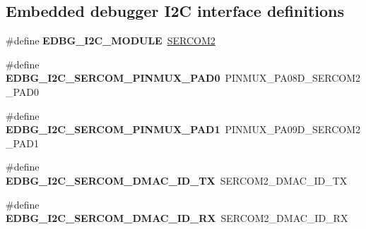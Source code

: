\subsection*{Embedded debugger I2\+C interface definitions}
\begin{DoxyCompactItemize}
\item 
\hypertarget{group__saml21__xplained__pro__features__group_ga86cb632d58e70b8725d9c8a744cc59d7}{}\#define {\bfseries E\+D\+B\+G\+\_\+\+I2\+C\+\_\+\+M\+O\+D\+U\+L\+E}~\hyperlink{group___s_a_m_l21_j18_a__base_ga918e4c85993961a115bb23b4bb73a87f}{S\+E\+R\+C\+O\+M2}\label{group__saml21__xplained__pro__features__group_ga86cb632d58e70b8725d9c8a744cc59d7}

\item 
\hypertarget{group__saml21__xplained__pro__features__group_gab571585897276d3ae0595dde62399f02}{}\#define {\bfseries E\+D\+B\+G\+\_\+\+I2\+C\+\_\+\+S\+E\+R\+C\+O\+M\+\_\+\+P\+I\+N\+M\+U\+X\+\_\+\+P\+A\+D0}~P\+I\+N\+M\+U\+X\+\_\+\+P\+A08\+D\+\_\+\+S\+E\+R\+C\+O\+M2\+\_\+\+P\+A\+D0\label{group__saml21__xplained__pro__features__group_gab571585897276d3ae0595dde62399f02}

\item 
\hypertarget{group__saml21__xplained__pro__features__group_ga9a63088aae8523035dfaf614581c4047}{}\#define {\bfseries E\+D\+B\+G\+\_\+\+I2\+C\+\_\+\+S\+E\+R\+C\+O\+M\+\_\+\+P\+I\+N\+M\+U\+X\+\_\+\+P\+A\+D1}~P\+I\+N\+M\+U\+X\+\_\+\+P\+A09\+D\+\_\+\+S\+E\+R\+C\+O\+M2\+\_\+\+P\+A\+D1\label{group__saml21__xplained__pro__features__group_ga9a63088aae8523035dfaf614581c4047}

\item 
\hypertarget{group__saml21__xplained__pro__features__group_gafd4f60f265b151b6e5890d78e85aad19}{}\#define {\bfseries E\+D\+B\+G\+\_\+\+I2\+C\+\_\+\+S\+E\+R\+C\+O\+M\+\_\+\+D\+M\+A\+C\+\_\+\+I\+D\+\_\+\+T\+X}~S\+E\+R\+C\+O\+M2\+\_\+\+D\+M\+A\+C\+\_\+\+I\+D\+\_\+\+T\+X\label{group__saml21__xplained__pro__features__group_gafd4f60f265b151b6e5890d78e85aad19}

\item 
\hypertarget{group__saml21__xplained__pro__features__group_ga9829cba8dec19de53bc493217522f63e}{}\#define {\bfseries E\+D\+B\+G\+\_\+\+I2\+C\+\_\+\+S\+E\+R\+C\+O\+M\+\_\+\+D\+M\+A\+C\+\_\+\+I\+D\+\_\+\+R\+X}~S\+E\+R\+C\+O\+M2\+\_\+\+D\+M\+A\+C\+\_\+\+I\+D\+\_\+\+R\+X\label{group__saml21__xplained__pro__features__group_ga9829cba8dec19de53bc493217522f63e}

\end{DoxyCompactItemize}
